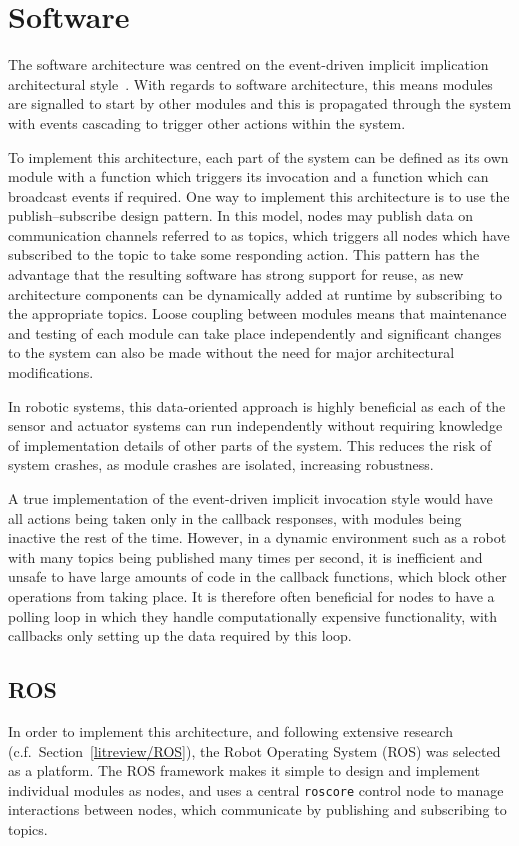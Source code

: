 
\chapter{Software}\label{software}
The software architecture was centred on the event-driven implicit implication
architectural style~\cite{garlan1993introduction}. With regards to software architecture, this means
modules are signalled to start by other modules and this is propagated through
the system with events cascading to trigger other actions within the system.

To implement this architecture, each part of the system can be defined as its own
module with a function which triggers its invocation and a function which can
broadcast events if required. One way to implement this architecture is to use
the publish--subscribe design pattern. In this model, nodes may publish data on communication channels
referred to as topics, which triggers all nodes which have subscribed to the
topic to take some responding action. This pattern has the advantage that
the resulting software has strong support for reuse, as new architecture
components can be dynamically added at runtime by subscribing to the appropriate
topics. Loose coupling between modules means that maintenance and testing
of each module can take place independently and significant changes to the
system can also be made without the need for major architectural modifications.

In robotic systems, this data-oriented approach is highly beneficial as each of
the sensor
and actuator systems can run independently without requiring knowledge of
implementation details of other parts of the system. This
reduces the risk of system crashes, as module crashes are isolated, increasing
robustness.

A true implementation of the event-driven implicit invocation style would have all
actions being taken only in the callback responses, with modules being inactive
the rest of the time. However, in a dynamic environment such as a robot with many
topics being published many times per second, it is inefficient and unsafe to have
large amounts of code in the callback functions, which block other operations from
taking place. It is therefore often beneficial for nodes to have a polling loop
in which they handle computationally expensive functionality, with
callbacks only setting up the data required by this loop.

\section{ROS}\label{soft/ROS}
In order to implement this architecture, and following extensive research
(c.f.\ Section~\ref{litreview/ROS}), the Robot Operating System (ROS) was
selected as a platform. The ROS framework makes it simple to design and implement
individual modules as nodes, and uses a central \verb|roscore| control
node to manage interactions between nodes, which communicate by publishing and
subscribing to topics.

